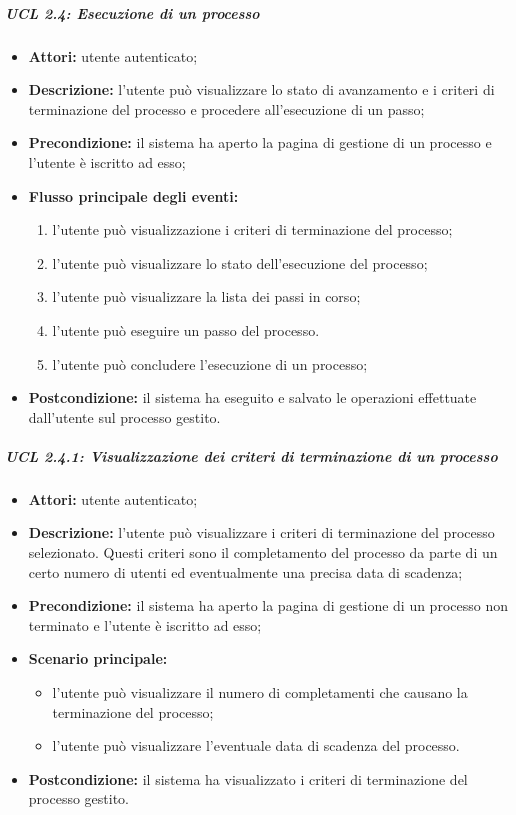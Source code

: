 \subparagraph{UCL 2.4: Esecuzione di un processo}
\begin{itemize}
\item \textbf{Attori:} utente autenticato;
\item \textbf{Descrizione:} l'utente può visualizzare lo stato di avanzamento e i criteri di terminazione del processo e procedere all'esecuzione di un passo;
\item \textbf{Precondizione:} il sistema ha aperto la pagina di gestione di un processo e l'utente è iscritto ad esso;
\item \textbf{Flusso principale degli eventi:}
\begin{enumerate}
\item l'utente può visualizzazione i criteri di terminazione del processo;
\item l'utente può visualizzare lo stato dell'esecuzione del processo;
\item l'utente può visualizzare la lista dei passi in corso;
\item l'utente può eseguire un passo del processo.
\item l'utente può concludere l'esecuzione di un processo;
\end{enumerate} 
\item \textbf{Postcondizione:} il sistema ha eseguito e salvato le operazioni effettuate dall'utente sul processo gestito.
\end{itemize}

\subparagraph{UCL 2.4.1: Visualizzazione dei criteri di terminazione di un processo}
\begin{itemize}
\item \textbf{Attori:} utente autenticato;
\item \textbf{Descrizione:} l'utente può visualizzare i criteri di terminazione del processo selezionato. Questi criteri sono il completamento del processo da parte di un certo numero di utenti ed eventualmente una precisa data di scadenza;
\item \textbf{Precondizione:} il sistema ha aperto la pagina di gestione di un processo non terminato e l'utente è iscritto ad esso;
\item \textbf{Scenario principale:}
\begin{itemize}
\item l'utente può visualizzare il numero di completamenti che causano la terminazione del processo;
\item l'utente può visualizzare l'eventuale data di scadenza del processo.
\end{itemize}
\item \textbf{Postcondizione:} il sistema ha visualizzato i criteri di terminazione del processo gestito.
\end{itemize}

